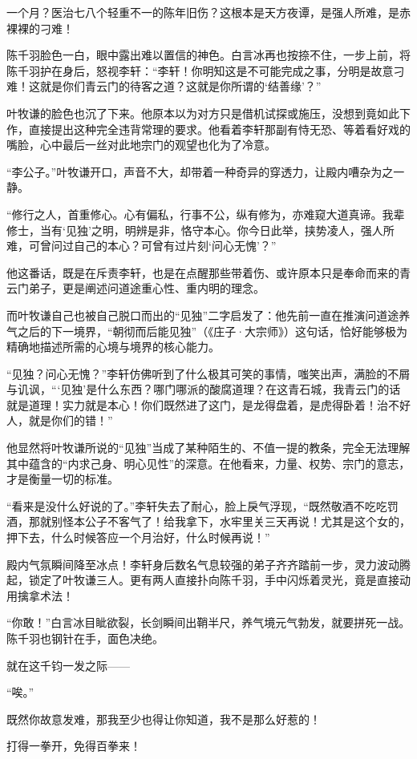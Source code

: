 一个月？医治七八个轻重不一的陈年旧伤？这根本是天方夜谭，是强人所难，是赤裸裸的刁难！

陈千羽脸色一白，眼中露出难以置信的神色。白言冰再也按捺不住，一步上前，将陈千羽护在身后，怒视李轩：“李轩！你明知这是不可能完成之事，分明是故意刁难！这就是你们青云门的待客之道？这就是你所谓的‘结善缘’？”

叶牧谦的脸色也沉了下来。他原本以为对方只是借机试探或施压，没想到竟如此下作，直接提出这种完全违背常理的要求。他看着李轩那副有恃无恐、等着看好戏的嘴脸，心中最后一丝对此地宗门的观望也化为了冷意。

“李公子。”叶牧谦开口，声音不大，却带着一种奇异的穿透力，让殿内嘈杂为之一静。

“修行之人，首重修心。心有偏私，行事不公，纵有修为，亦难窥大道真谛。我辈修士，当有‘见独’之明，明辨是非，恪守本心。你今日此举，挟势凌人，强人所难，可曾问过自己的本心？可曾有过片刻‘问心无愧’？”

他这番话，既是在斥责李轩，也是在点醒那些带着伤、或许原本只是奉命而来的青云门弟子，更是阐述问道途重心性、重内明的理念。

而叶牧谦自己也被自己脱口而出的“见独”二字启发了：他先前一直在推演问道途养气之后的下一境界，“朝彻而后能见独”（《庄子·大宗师》）这句话，恰好能够极为精确地描述所需的心境与境界的核心能力。

“见独？问心无愧？”李轩仿佛听到了什么极其可笑的事情，嗤笑出声，满脸的不屑与讥讽，“‘见独’是什么东西？哪门哪派的酸腐道理？在这青石城，我青云门的话就是道理！实力就是本心！你们既然进了这门，是龙得盘着，是虎得卧着！治不好人，就是你们的错！”

他显然将叶牧谦所说的“见独”当成了某种陌生的、不值一提的教条，完全无法理解其中蕴含的“内求己身、明心见性”的深意。在他看来，力量、权势、宗门的意志，才是衡量一切的标准。

“看来是没什么好说的了。”李轩失去了耐心，脸上戾气浮现，“既然敬酒不吃吃罚酒，那就别怪本公子不客气了！给我拿下，水牢里关三天再说！尤其是这个女的，押下去，什么时候答应一个月治好，什么时候再说！”

殿内气氛瞬间降至冰点！李轩身后数名气息较强的弟子齐齐踏前一步，灵力波动腾起，锁定了叶牧谦三人。更有两人直接扑向陈千羽，手中闪烁着灵光，竟是直接动用擒拿术法！

“你敢！”白言冰目眦欲裂，长剑瞬间出鞘半尺，养气境元气勃发，就要拼死一战。陈千羽也钢针在手，面色决绝。

就在这千钧一发之际——

“唉。”

既然你故意发难，那我至少也得让你知道，我不是那么好惹的！

打得一拳开，免得百拳来！

